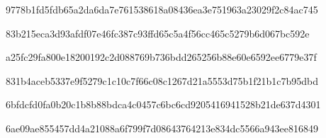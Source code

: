 \par\noindent\begin{minipage}{\linewidth}
\par
{\footnotesize\ttfamily 9778b1fd5fdb65a2da6da7e761538618a08436ea3e751963a23029f2c84ac745}\par
\end{minipage}\par\smallskip
\par\noindent\begin{minipage}{\linewidth}
\par
{\footnotesize\ttfamily 83b215eca3d93afdf07e46fc387c93ffd65c5a4f56cc465c5279b6d067bc592e}\par
\end{minipage}\par\smallskip
\par\noindent\begin{minipage}{\linewidth}
\par
{\footnotesize\ttfamily a25fc29fa800e18200192c2d088769b736bdd265256b88e60e6592ee6779e37f}\par
\end{minipage}\par\smallskip
\par\noindent\begin{minipage}{\linewidth}
\par
{\footnotesize\ttfamily 831b4aceb5337e9f5279c1c10c7f66c08c1267d21a5553d75b1f21b1c7b95dbd}\par
\end{minipage}\par\smallskip
\par\noindent\begin{minipage}{\linewidth}
\par
{\footnotesize\ttfamily 6bfdcfd0fa0b20c1b8b88bdca4c0457c6bc6cd9205416941528b21de637d4301}\par
\end{minipage}\par\smallskip
\par\noindent\begin{minipage}{\linewidth}
\par
{\footnotesize\ttfamily 6ae09ae855457dd4a21088a6f799f7d08643764213e834dc5566a943ee816849}\par
\end{minipage}\par\smallskip
